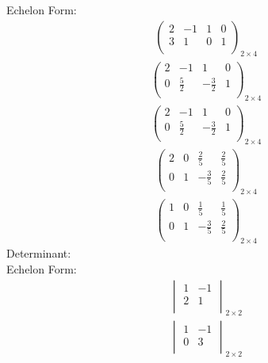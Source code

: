 \documentclass{article}
\begin{document}
Echelon Form:\\
\begin{align*}
\left(
\begin{array}{cc|cc}
2 & -1 & 1 & 0\\
3 & 1 & 0 & 1\\
\end{array}
\right)_{2\times 4}
\end{align*}
\begin{align*}
\left(
\begin{array}{cc|cc}
2 & -1 & 1 & 0\\
0 & \frac{5}{2} & -\frac{3}{2} & 1\\
\end{array}
\right)_{2\times 4}
\end{align*}
\begin{align*}
\left(
\begin{array}{cc|cc}
2 & -1 & 1 & 0\\
0 & \frac{5}{2} & -\frac{3}{2} & 1\\
\end{array}
\right)_{2\times 4}
\end{align*}
\begin{align*}
\left(
\begin{array}{cc|cc}
2 & 0 & \frac{2}{5} & \frac{2}{5}\\
0 & 1 & -\frac{3}{5} & \frac{2}{5}\\
\end{array}
\right)_{2\times 4}
\end{align*}
\begin{align*}
\left(
\begin{array}{cc|cc}
1 & 0 & \frac{1}{5} & \frac{1}{5}\\
0 & 1 & -\frac{3}{5} & \frac{2}{5}\\
\end{array}
\right)_{2\times 4}
\end{align*}
Determinant:\\
Echelon Form:\\
\begin{align*}
\begin{vmatrix}
1 & -1\\
2 & 1\\
\end{vmatrix}_{2\times 2}
\end{align*}
\begin{align*}
\begin{vmatrix}
1 & -1\\
0 & 3\\
\end{vmatrix}_{2\times 2}
\end{align*}
\end{document}
